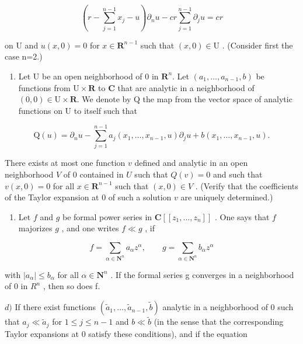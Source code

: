\[
\left(r - \sum_ {j = 1} ^ {n - 1} x _ {j} - u\right) \partial_ {n} u - c r \sum_ {j = 1} ^ {n - 1} \partial_ {j} u = c r
\]

on U and \(u(x,0)=0\) for \(x\in\mathbf{R}^{n-1}\) such that \((x,0)\in\mathrm{U}\) . (Consider first the case n=2.)

\begin{enumerate}
\def\labelenumi{\alph{enumi})}
\setcounter{enumi}{1}
\tightlist
\item
  Let U be an open neighborhood of 0 in \(\mathbf{R}^{n}\). Let \((a_{1},\ldots,a_{n-1},b)\) be functions from \(\mathrm{U}\times\mathbf{R}\) to \(\mathbf{C}\) that are analytic in a neighborhood of \((0,0)\in\mathrm{U}\times\mathbf{R}\). We denote by Q the map from the vector space of analytic functions on U to itself such that
\end{enumerate}

\[
\mathrm{Q} (u) = \partial_ {n} u - \sum_ {j = 1} ^ {n - 1} a _ {j} (x _ {1}, \dots , x _ {n - 1}, u) \partial_ {j} u + b (x _ {1}, \dots , x _ {n - 1}, u).
\]

There exists at most one function \(v\) defined and analytic in an open neighborhood \(V\) of 0 contained in \(U\) such that \(Q(v) = 0\) and such that \(v(x,0) = 0\) for all \(x \in \mathbf{R}^{n-1}\) such that \((x,0) \in V\) . (Verify that the coefficients of the Taylor expansion at 0 of such a solution \(v\) are uniquely determined.)

\begin{enumerate}
\def\labelenumi{\alph{enumi})}
\setcounter{enumi}{2}
\tightlist
\item
  Let \(f\) and \(g\) be formal power series in \(\mathbf{C}[[z_1, \ldots, z_n]]\) . One says that \(f\) majorizes \(g\) , and one writes \(f \ll g\) , if
\end{enumerate}

\[
f = \sum_ {\alpha \in \mathbf {N} ^ {n}} a _ {\alpha} z ^ {\alpha}, \qquad g = \sum_ {\alpha \in \mathbf {N} ^ {n}} b _ {\alpha} z ^ {\alpha}
\]

with \(|a_{\alpha}| \leqslant b_{\alpha}\) for all \(\alpha \in \mathbf{N}^{n}\) . If the formal series g converges in a neighborhood of 0 in \(R^{n}\) , then so does f.

\(d)\) If there exist functions \((\widetilde{a}_1, \ldots, \widetilde{a}_{n-1}, \widetilde{b})\) analytic in a neighborhood of 0 such that \(a_j \ll \widetilde{a}_j\) for \(1 \leqslant j \leqslant n-1\) and \(b \ll \widetilde{b}\) (in the sense that the corresponding Taylor expansions at 0 satisfy these conditions), and if the equation

